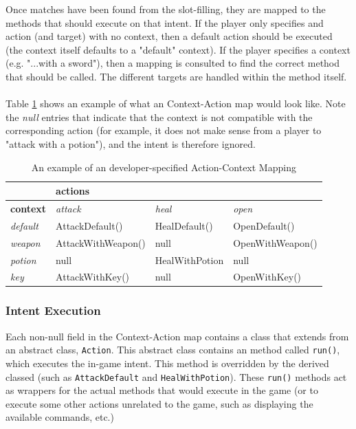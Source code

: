 \documentclass[11pt]{article}
\begin{document}
Once matches have been found from the slot-filling, they are mapped to the methods that should execute on that intent. If the player only specifies and action (and target) with no context, then a default action should be executed (the context itself defaults to a "default" context). If the player specifies a context (e.g. "...with a sword"), then a mapping is consulted to find the correct method that should be called. The different targets are handled within the method itself.
\\
\\
Table \ref{action-context-ex-table} shows an example of what an Context-Action map would look like. Note the \textit{null} entries that indicate that the context is not compatible with the corresponding action (for example, it does not make sense from a player to "attack with a potion"), and the intent is therefore ignored.

\begin{table}[H]
\centering
\caption{An example of an developer-specified Action-Context Mapping}
\label{action-context-ex-table}
\begin{tabular}{l|l|l|l|}
\cline{2-4}
\multicolumn{1}{c|}{\textbf{}}         & \multicolumn{3}{l|}{\textbf{actions}}                  \\ \hline
\multicolumn{1}{|l|}{\textbf{context}} & \textit{attack}    & \textit{heal}  & \textit{open}    \\ \hline
\multicolumn{1}{|l|}{\textit{default}} & AttackDefault()    & HealDefault()  & OpenDefault()    \\ \hline
\multicolumn{1}{|l|}{\textit{weapon}}  & AttackWithWeapon() & null           & OpenWithWeapon() \\ \hline
\multicolumn{1}{|l|}{\textit{potion}}  & null               & HealWithPotion & null             \\ \hline
\multicolumn{1}{|l|}{\textit{key}}     & AttackWithKey()    & null           & OpenWithKey()   \\ \hline
\end{tabular}
\end{table}

\subsubsection{Intent Execution}

Each non-null field in the Context-Action map contains a class that extends from an abstract class, \texttt{Action}. This abstract class contains an method called \texttt{run()}, which executes the in-game intent. This method is overridden by the derived classed (such as \texttt{AttackDefault} and \texttt{HealWithPotion}). These \texttt{run()} methods act as wrappers for the actual methods that would execute in the game (or to execute some other actions unrelated to the game, such as displaying the available commands, etc.)
\end{document}
